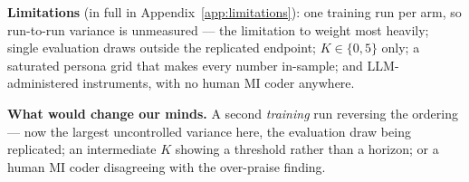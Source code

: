 \textbf{Limitations} (in full in Appendix~\ref{app:limitations}): one training run per arm, so
run-to-run variance is unmeasured --- the limitation to weight most heavily; single evaluation
draws outside the replicated endpoint; $K \in \{0,5\}$ only; a saturated persona grid that makes
every number in-sample; and LLM-administered instruments, with no human MI coder anywhere.

\textbf{What would change our minds.} A second \emph{training} run reversing the ordering --- now
the largest uncontrolled variance here, the evaluation draw being replicated; an intermediate $K$
showing a threshold rather than a horizon; or a human MI coder disagreeing with the over-praise
finding.
